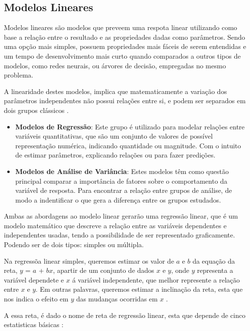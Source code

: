 \documentclass[
	12pt,				%
	openright,			%
	oneside,			%
	a4paper,			%
	english,			%
	brazil				%
	]{abntex2}
\begin{document}
\subsection{Modelos Lineares}

Modelos lineares são modelos que preveem uma respota linear utilizando como base a relação entre o resultado
e as propriedades dadas como parâmetros. Sendo uma opção mais simples, possuem propriedades mais fáceis de
serem entendidas e um tempo de desenvolvimento mais curto quando comparados a outros tipos de modelos,
como redes neurais, ou árvores de decisão, empregadas no mesmo problema. \cite{modelos_lineares}

A linearidade destes modelos, implica que matematicamente a variação dos parâmetros independentes não
possui relações entre si, e podem ser separados em dois grupos clássicos \cite{tipos_modelos_lineares}.
\begin{itemize}
	\item \textbf{Modelos de Regressão}:
	Este grupo é utilizado para modelar relações entre variáveis quantitativas, que são um conjunto de
	valores de possível representação numérica, indicando quantidade ou magnitude. Com o intuito de estimar
	parâmetros, explicando relações ou para fazer predições.
	\item \textbf{Modelos de Análise de Variância}:
	Estes modelos têm como questão principal comparar a importância de fatores sobre o comportamento da
	variável de resposta. Para encontrar a relação entre grupos de análise, de modo a indentificar o que
	gera a diferença entre os grupos estudados.
\end{itemize}

Ambas as abordagens ao modelo linear gerarão uma regressão linear, que é um modelo matemático que descreve 
a relação entre as variáveis dependentes e independentes usadas, tendo a possibilidade de ser representado 
graficamente. Podendo ser de dois tipos: simples ou múltipla.

Na regressõa linear simples, queremos estimar os valor de $a$ e $b$ da equação da reta, $y$ = $a$ + $bx$, 
apartir de um conjunto de dados $x$ e $y$, onde $y$ representa a variável  dependete e $x$ á variável  
independente, que melhor represente a relação entre $x$ e $y$. Em outras palavras, queremos estimar a 
inclinação da reta, esta que nos indica o efeito em $y$ das mudanças ocorridas em $x$ 
\cite{modelos_regressao_linear}.

A essa reta, é dado o nome de reta de regressão linear, esta que depende de cinco estatisticas básicas
\cite{modelos_regressao_linear}:
\end{document}
